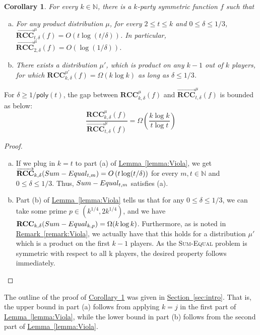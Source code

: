 \documentclass[11pt]{article}
\numberwithin{equation}{section}
\newtheorem{corollary}[theorem]{Corollary}
\theoremstyle{definition}
\theoremstyle{plain}
\newcommand{\N}{\mathbb N}
\newcommand{\expref}[2]{\hyperref[#2]{#1~\ref{#2}}}
\newcommand{\poly}{\mathsf{poly}}
\newcommand{\error}{\ensuremath{\delta}}
\newcommand{\bigo}[1]{\ensuremath{{{O} \left( {#1} \right)}}}
\newcommand{\bigomega}[1]{\ensuremath{{\Omega \left( {#1} \right)}}}
\newcommand{\rcc}{\ensuremath{\mathbf{RCC}}}
\newcommand{\rccone}{\ensuremath{\overrightarrow{\mathbf{RCC}}}}
\newcommand{\sumequal}{\textsc{Sum-Equal} }
\begin{document}
\begin{corollary}\label{corollary:log-separation}
For every $k\in \N$, there is a $k$-party symmetric function $f$ such that

\begin{enumerate}[(a)]
	\item For any product distribution $\mu$, 
              for every $2\le t\le k$ and $0\le \error \le 1/3$, 
	$\rccone_{t,\error}^{\mu}(f)=\bigo{t\log(t/\error)}$.
%
	In particular, $\rccone_{2,\error}^{\mu}(f)=\bigo{\log(1/\error)}$.

	\item There exists a distribution $\mu'$, which is product on any
              $k-1$ out of $k$ players, for which 
              $\rcc_{k,\error}^{\mu'}(f)= \bigomega{k\log k}$ 
              as long as $\error \le 1/3$.	
\end{enumerate}
\end{corollary}

For $\error\ge 1/\poly(t)$,  
the gap between $\rcc_{k,\error}^{\mu}(f)$ and $\rccone_{t,\error}^{\mu}(f)$ is bounded as below:
\[\frac{\rcc_{k,\error}^{\mu}(f)} {\rccone_{t,\error}^{\mu}(f)} = \bigomega{\frac{k\log k}{t\log t}}\]

{\color{black}
\begin{proof}
\begin{enumerate}[(a)]
    \item If we plug in $k=t$ to part (a) of \expref{Lemma}{lemma:Viola}, we get $\rccone_{k,\error}(\sumequal_{t,m}) = \bigo{t\log (t/\error)}$ for every $m,t \in \N$ and $0 \le \delta \le 1/3$. Thus, $\sumequal_{t,m}$ satisfies (a).
    \item Part (b) of \expref{Lemma}{lemma:Viola} tells us that for any $0 \le \delta \le 1/3$, we can take some prime $p \in (k^{1/4},2k^{1/4})$, and we have $\rcc_{k,\delta}(\sumequal_{k,p}) = \Omega(k\log k)$. Furthermore, as is noted in \expref{Remark}{remark:Viola}, we actually have that this holds for a distribution $\mu'$ which is a product on the first $k-1$ players. As the \sumequal problem is symmetric with respect to all k players, the desired property follows immediately.
\end{enumerate}
\end{proof}
}

The outline of the proof of \expref{Corollary}{corollary:log-separation} was given in \expref{Section}{sec:intro}.
That is, the upper bound in part (a) follows from applying $k = j$ in 
the first part of \expref{Lemma}{lemma:Viola},
while the lower bound in part (b) follows from the second part of \expref{Lemma}{lemma:Viola}. 
\end{document}
